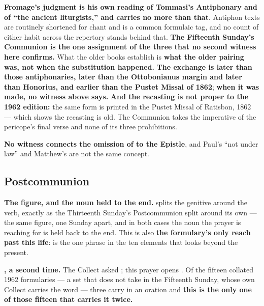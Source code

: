\textbf{Fromage's judgment is his own reading of Tommasi's Antiphonary and of
``the ancient liturgists,'' and carries no more than that}. Antiphon texts are routinely shortened for chant and  is a common formulaic tag, and no count of either habit across the
repertory stands behind that. \textbf{The Fifteenth Sunday's Communion is the one assignment of the three
that no second witness here confirms.} What the older books
establish is \textbf{what the older pairing was, not when the substitution
happened.} \textbf{The exchange is later than those
antiphonaries, later than the Ottobonianus margin and later than Honorius, and
earlier than the Pustet Missal of 1862}; \textbf{when it was made, no witness
above says.} \textbf{And the
recasting is not proper to the 1962 edition:} the same form is printed in the
Pustet Missal of Ratisbon, 1862 --- which shows the recasting is old. The
Communion takes the imperative of the pericope's final verse and none of its
three prohibitions.

\textbf{No witness connects the omission of  to the
Epistle}, and Paul's ``not under law'' and Matthew's  are not
the same concept.

\elementguard
\subsection*{Postcommunion }


\textbf{The figure, and the noun held to the end.}  splits the genitive around the verb, exactly as the
Thirteenth Sunday's Postcommunion split  around its own --- the same figure, one Sunday apart, and in both
cases the noun the prayer is reaching for is held back to the end. This is also
\textbf{the formulary's only reach past this life}: \latin{perpétuæ
salvatiónis} is the one phrase in the ten elements that looks beyond the
present.

\textbf{, a second time.} The Collect asked ; this prayer opens . Of the fifteen collated 1962
formularies --- a set that does not take in the
Fifteenth Sunday, whose own Collect carries the word --- three carry
\latin{semper} in an oration and \textbf{this is the only one of those fifteen
that carries it twice.}

